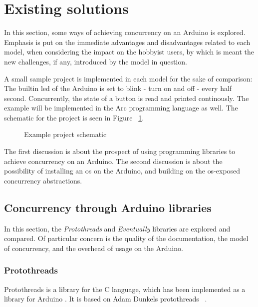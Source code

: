 \section{Existing solutions}\label{sec:existingsolutions}
In this section, some ways of achieving concurrency on an Arduino is explored. Emphasis is put on the immediate advantages and disadvantages related to each model, when considering the impact on the hobbyist users, by which is meant the new challenges, if any, introduced by the model in question.

A small sample project is implemented in each model for the sake of comparison: The builtin \gls{led} of the Arduino is set to blink - turn on and off - every half second. Concurrently, the state of a button is read and printed continously. The example will be implemented in the Arc programming language as well. The schematic for the project is seen in Figure ~\ref{fig:exampleprojectschematic}.


\begin{figure}[htb!]
  \centering
  \caption{Example project schematic}
  \label{fig:exampleprojectschematic}
\end{figure}


The first discussion is about the prospect of using programming libraries to achieve concurrency on an Arduino. The second discussion is about the possibility of installing an \gls{os} on the Arduino, and building on the \gls{os}-exposed concurrency abstractions.

\subsection{Concurrency through Arduino libraries}\label{subsec:arduinolibraries}
In this section, the \textit{Protothreads} and \textit{Eventually} libraries are explored and compared. Of particular concern is the quality of the documentation, the model of concurrency, and the overhead of usage on the Arduino.

\subsubsection{Protothreads}
Protothreads is a library for the C language, which has been implemented as a library for Arduino \cite{Artin2020}. It is based on Adam Dunkels protothreads ~\cite{AdamDunkelProtothreads}.


